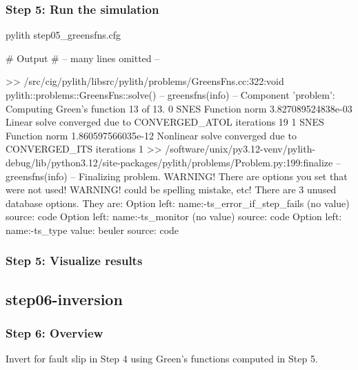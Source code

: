 \documentclass[aspectratio=169]{beamer}
\begin{document}
\begin{frame}[fragile]
  \frametitle{Step 5: Run the simulation}
  \summary{}

\begin{bashcode}
pylith step05_greensfns.cfg

# Output
# -- many lines omitted --

 >> /src/cig/pylith/libsrc/pylith/problems/GreensFns.cc:322:void pylith::problems::GreensFns::solve()
 -- greensfns(info)
 -- Component 'problem': Computing Green's function 13 of 13.
  0 SNES Function norm 3.827089524838e-03
    Linear solve converged due to CONVERGED_ATOL iterations 19
  1 SNES Function norm 1.860597566035e-12
  Nonlinear solve converged due to CONVERGED_ITS iterations 1
 >> /software/unix/py3.12-venv/pylith-debug/lib/python3.12/site-packages/pylith/problems/Problem.py:199:finalize
 -- greensfns(info)
 -- Finalizing problem.
WARNING! There are options you set that were not used!
WARNING! could be spelling mistake, etc!
There are 3 unused database options. They are:
Option left: name:-ts_error_if_step_fails (no value) source: code
Option left: name:-ts_monitor (no value) source: code
Option left: name:-ts_type value: beuler source: code
\end{bashcode}
  
\end{frame}


\begin{frame}
  \frametitle{Step 5: Visualize results}

    
\end{frame}


\subsection{step06-inversion}

\begin{frame}
  \frametitle{Step 6: Overview}
  \summary{}

  Invert for fault slip in Step 4 using Green's functions computed in Step 5.
      
\end{frame}
\end{document}
